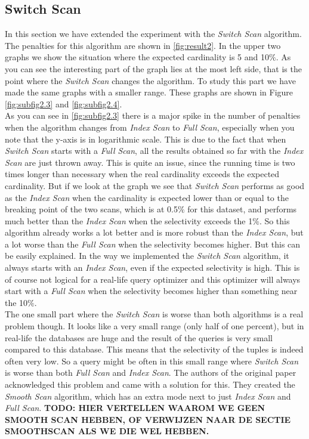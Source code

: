 \documentclass[a4paper,11pt,twoside]{article}
\begin{document}
\subsection{Switch Scan}
In this section we have extended the experiment with the \textit{Switch Scan} algorithm. The penalties for this algorithm are shown in \autoref{fig:result2}. In the upper two graphs we show the situation where the expected cardinality is 5 and 10$\%$. As you can see the interesting part of the graph lies at the most left side, that is the point where the \textit{Switch Scan} changes the algorithm. To study this part we have made the same graphs with a smaller range. These graphs are shown in Figure \autoref{fig:subfig2.3} and \autoref{fig:subfig2.4}.\\
As you can see in \autoref{fig:subfig2.3} there is a major spike in the number of penalties when the algorithm changes from \textit{Index Scan} to \textit{Full Scan}, especially when you note that the y-axis is in logarithmic scale. This is due to the fact that when \textit{Switch Scan} starts with a \textit{Full Scan}, all the results obtained so far with the \textit{Index Scan} are just thrown away. This is quite an issue, since the running time is two times longer than necessary when the real cardinality exceeds the expected cardinality. But if we look at the graph we see that \textit{Switch Scan} performs as good as the \textit{Index Scan} when the cardinality is expected lower than or equal to the breaking point of the two scans, which is at 0.5$\%$ for this dataset, and performs much better than the \textit{Index Scan} when the selectivity exceeds the 1$\%$. So this algorithm already works a lot better and is more robust than the \textit{Index Scan}, but a lot worse than the \textit{Full Scan} when the selectivity becomes higher. But this can be easily explained. In the way we implemented the \textit{Switch Scan} algorithm, it always starts with an \textit{Index Scan}, even if the expected selectivity is high. This is of course not logical for a real-life query optimizer and this optimizer will always start with a \textit{Full Scan} when the selectivity becomes higher than something near the 10$\%$.\\
The one small part where the \textit{Switch Scan} is worse than both algorithms is a real problem though. It looks like a very small range (only half of one percent), but in real-life the databases are huge and the result of the queries is very small compared to this database. This means that the selectivity of the tuples is indeed often very low. So a query might be often in this small range where \textit{Switch Scan} is worse than both \textit{Full Scan} and \textit{Index Scan}. The authors of the original paper acknowledged this problem and came with a solution for this. They created the \textit{Smooth Scan} algorithm, which has an extra mode next to just \textit{Index Scan} and \textit{Full Scan}. \textbf{TODO: HIER VERTELLEN WAAROM WE GEEN SMOOTH SCAN HEBBEN, OF VERWIJZEN NAAR DE SECTIE SMOOTHSCAN ALS WE DIE WEL HEBBEN.}
\end{document}
